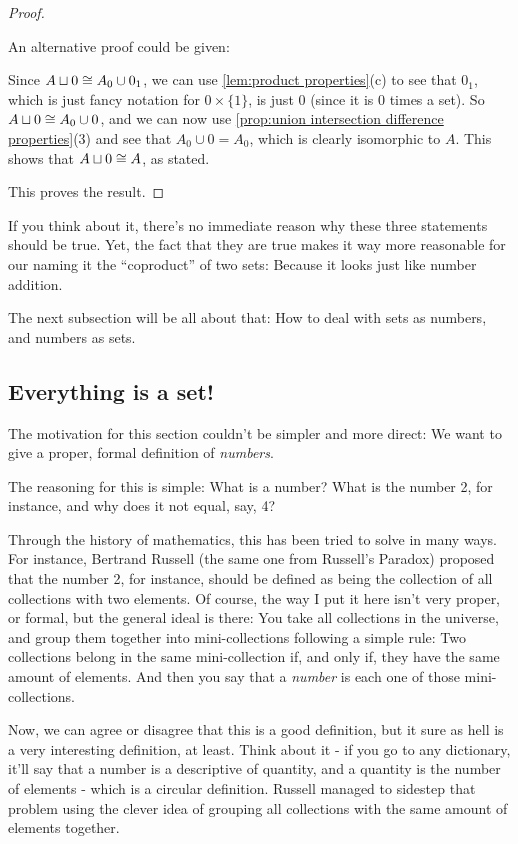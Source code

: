 \begin{proof}
\begin{enumerate}[(a)]
		\bigskip
		An alternative proof could be given:
		
		Since $A\sqcup 0\cong A_0\cup 0_1$, we can use \cref{lem:product properties}(c) to see that $0_1$, which is just fancy notation for $0\times\{1\}$, is just $0$ (since it is 0 times a set). So $A\sqcup0\cong A_0\cup 0$, and we can now use \cref{prop:union intersection difference properties}(3) and see that $A_0\cup0=A_0$, which is clearly isomorphic to $A$. This shows that $A\sqcup 0\cong A$, as stated.
	\end{enumerate}

This proves the result.
\end{proof}

If you think about it, there's no immediate reason why these three statements should be true. Yet, the fact that they are true makes it way more reasonable for our naming it the ``coproduct'' of two sets: Because it looks just like number addition.

The next subsection will be all about that: How to deal with sets as numbers, and numbers as sets.

\newpage
\subsection{Everything is a set!}

The motivation for this section couldn't be simpler and more direct: We want to give a proper, formal definition of \textit{numbers}.

The reasoning for this is simple: What is a number? What is the number 2, for instance, and why does it not equal, say, 4?

Through the history of mathematics, this has been tried to solve in many ways. For instance, Bertrand Russell (the same one from Russell's Paradox) proposed that the number 2, for instance, should be defined as being the collection of all collections with two elements. Of course, the way I put it here isn't very proper, or formal, but the general ideal is there: You take all collections in the universe, and group them together into mini-collections following a simple rule: Two collections belong in the same mini-collection if, and only if, they have the same amount of elements. And then you say that a \textit{number} is each one of those mini-collections.

Now, we can agree or disagree that this is a good definition, but it sure as hell is a very interesting definition, at least. Think about it - if you go to any dictionary, it'll say that a number is a descriptive of quantity, and a quantity is the number of elements - which is a circular definition. Russell managed to sidestep that problem using the clever idea of grouping all collections with the same amount of elements together.

